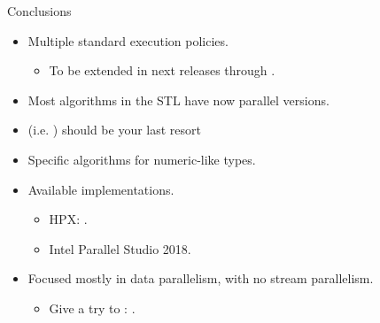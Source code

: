 \begin{frame}[t]{Conclusions}
\begin{itemize}
  \item Multiple standard execution policies.
    \begin{itemize}
      \item To be extended in next releases through .
    \end{itemize}

  \vfill\pause
  \item Most algorithms in the STL have now parallel versions.

  \vfill\pause
  \item {} (i.e. ) should be your
        last resort

  \vfill\pause
  \item Specific algorithms for numeric-like types.

  \vfill\pause
  \item Available implementations.
    \begin{itemize}
      \item HPX: .
      \item Intel Parallel Studio 2018.
    \end{itemize}

  \vfill\pause
  \item Focused mostly in data parallelism, with no stream parallelism.
    \begin{itemize}
      \item Give a try to : .
    \end{itemize}
  
\end{itemize}
\end{frame}
